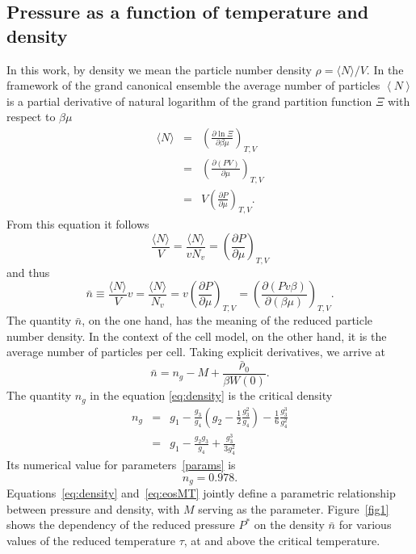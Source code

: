 \documentclass[12pt]{article}
\begin{document}
	
	\subsection{Pressure as a function of temperature and density}
	In this work, by density we mean the particle number density $\rho = \langle N \rangle / V$.
	In the framework of the grand canonical ensemble the average number of particles $\left\langle N \right\rangle$ is a partial derivative of natural logarithm of the grand partition function $\Xi$ with respect to $\beta \mu$ 
	\begin{eqnarray*}
		\langle N \rangle & = & \left(\frac{\partial \ln\Xi}{\partial \beta \mu}\right)_{T,V} 
		\\
		& = & \left(\frac{\partial (PV)}{\partial \mu}\right)_{T,V}
		\\
		& = & V \left(\frac{\partial P}{\partial \mu}\right)_{T,V}.
	\end{eqnarray*}
	From this equation it follows
	\begin{equation*}
		\frac{\langle N \rangle}{V} = \frac{\langle N \rangle}{v N_v} = \left(\frac{\partial P}{\partial \mu}\right)_{T,V}
	\end{equation*}
	and thus
	\begin{equation}
		\bar{n} \equiv \frac{\langle N \rangle}{V} v = \frac{\langle N \rangle}{N_v} = v \left(\frac{\partial P}{\partial \mu}\right)_{T,V} 
		= \left(\frac{\partial (Pv\beta)}{\partial (\beta \mu)}\right)_{T,V}.
	\end{equation}
	The quantity $\bar{n}$, on the one hand, has the meaning of the reduced particle number density. In the context of the cell model, on the other hand, it is the average number of particles per cell.
	Taking explicit derivatives, we arrive at
	\begin{equation}\label{eq:density}
	\bar n = n_g - M + \frac{ \bar \rho_0}{\beta W(0)}.
	\end{equation}
	The quantity $n_g$ in the equation \eqref{eq:density} is the critical density
	\begin{eqnarray}\label{eq:crit_dens}
	n_g & = & g_1 - \frac{g_3}{g_4}\left(  g_2 - \frac{1}{2} \frac{g_3^2}{g_4}\right) - \frac{1}{6} \frac{g_3^3}{g_4^2} 
	\nonumber\\
	& = & g_1 - \frac{g_2 g_3}{g_4} + \frac{g_3^3}{3g_4^2}
	\end{eqnarray}
	Its numerical value for parameters~\eqref{params} is
	\begin{equation*}
		n_g = 0.978.
	\end{equation*}
	Equations~\eqref{eq:density} and~\eqref{eq:eosMT} jointly define a parametric relationship between pressure and density, with $M$ serving as the parameter. Figure~\ref{fig1} shows the dependency of the reduced pressure $P^*$ on the density $\bar{n}$ for various values of the reduced temperature $\tau$, at and above the critical temperature.
	
\end{document}
